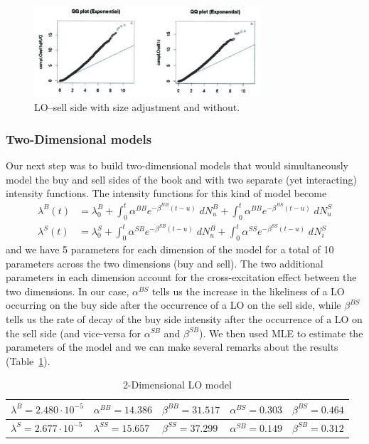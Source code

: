 	\begin{figure}[!ht]
   	\centering
   	\includegraphics[width=0.75\textwidth]{chapters/chapter_trade_data_models/figures/losellsideadj.png} 
   	\caption{LO--sell side with size adjustment and without. \label{fig:losellsideadj}}
	\end{figure}


\subsubsection{Two-Dimensional models}


Our next step was to build two-dimensional models that would simultaneously model the buy and sell sides of the book and with two separate (yet interacting) intensity functions. The intensity functions for this kind of model become
	\[
	\begin{split}
	\lambda^B(t)&= \lambda_0^B + \int_0^t \alpha^{BB} e^{-\beta^{BB}(t-u)} \;dN_u^B + \int_0^t \alpha^{BB} e^{-\beta^{BS}(t-u)} \;dN_u^S \\
	\lambda^S(t)&= \lambda_0^S + \int_0^t \alpha^{SB} e^{-\beta^{SB}(t-u)} \; dN_u^B + \int_0^t \alpha^{SS} e^{-\beta^{SS}(t-u)} \;dN_i^S
	\end{split}
	\]
and we have 5 parameters for each dimension of the model for a total of 10 parameters across the two dimensions (buy and sell). The two additional parameters in each dimension account for the cross-excitation effect between the two dimensions. In our case, $\alpha^{BS}$ tells us the increase in the likeliness of a LO occurring on the buy side after the occurrence of a LO on the sell side, while $\beta^{BS}$ tells us the rate of decay of the buy side intensity after the occurrence of a LO on the sell side (and vice-versa for $\alpha^{SB}$ and $\beta^{SB}$). We then used MLE to estimate the parameters of the model and we can make several remarks about the results (Table~\ref{tab:2dimlomodel}).
	\begin{table}
	\centering
	\caption{2-Dimensional LO model \label{tab:2dimlomodel}}
	\begin{tabular}{lllll}  
	$\lambda^B=2.480 \cdot 10^{-5}$ & $\alpha^{BB}=14.386$ & $\beta^{BB}=31.517$ & $\alpha^{BS}=0.303$ & $\beta^{BS}=0.464$ \\ \hline
	$\lambda^S=2.677 \cdot 10^{-5}$ & $\lambda^{SS}=15.657$ & $\beta^{SS}=37.299$ & $\alpha^{SB}=0.149$ & $\beta^{SB}=0.312$ \\ 
	\end{tabular}
	\end{table}
	
